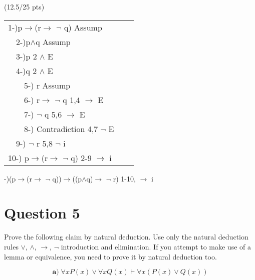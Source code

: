 \documentclass[a4paper,12pt]{article}
\newcommand\tab[1][1cm]{\hspace*{#1}}
\begin{document}
\hfill \small{(12.5/25 pts)}\\
\begin{tcolorbox}
\begin{tabular}{|l|l|l|l|l|l|l|l|l|}
\hline
\multicolumn{9}{|l|}{1-)p$\rightarrow$(r$\rightarrow$ $\lnot$ q) Assump}             \\ \cline{2-8}
 & \multicolumn{7}{l|}{2-)p$\land$q Assump}        &  \\
 & \multicolumn{7}{l|}{3-)p 2 $\land$ E}        &  \\
 & \multicolumn{7}{l|}{4-)q 2 $\land$ E}        &  \\ \cline{3-7}
 &   & \multicolumn{5}{l|}{5-) r Assump} &  &  \\
 &   & \multicolumn{5}{l|}{6-) r$\rightarrow$ $\lnot$ q 1,4 $\rightarrow$ E} &  &  \\
 &   & \multicolumn{5}{l|}{7-) $\lnot$ q 5,6 $\rightarrow$ E} &  &  \\
 &   & \multicolumn{5}{l|}{8-) Contradiction 4,7 $\lnot$ E } &  &  \\ \cline{3-7}
 & \multicolumn{7}{l|}{9-) $\lnot$ r 5,8 $\lnot$ i }        &  \\ \cline{2-8}
\multicolumn{9}{|l|}{10-) p$\rightarrow$(r$\rightarrow$ $\lnot$ q) 2-9 $\rightarrow$ i }             \\ \hline
\end{tabular}
-)(p$\rightarrow$(r$\rightarrow$ $\lnot$ q))$\rightarrow$((p$\land$q)$\rightarrow$ $\lnot$ r) 1-10, $\rightarrow$ i
\end{tcolorbox}
\newpage
\section*{Question 5 \hfill {}}
\tab Prove the following claim by natural deduction. Use only the natural deduction rules $\vee$, $\wedge$, $\rightarrow$, $\neg$ introduction and elimination. If you attempt to make use of a lemma or equivalence, you need to prove it by natural deduction too.


\begin{equation*}
    \textbf{a)} \; \forall x P(x) \vee \forall x Q(x) \vdash \forall x (P(x) \vee Q(x)) 
\end{equation*}
\end{document}
